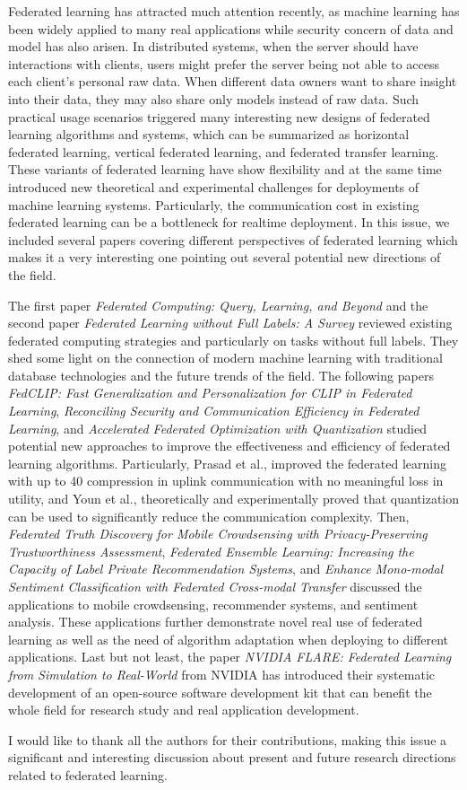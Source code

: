 \documentclass[11pt]{article}
\begin{document}
Federated learning has attracted much attention recently, as machine learning has been widely applied to many real applications while security concern of data and model has also arisen. In distributed systems, when the server should have interactions with clients, users might prefer the server being not able to access each client's personal raw data. When different data owners want to share insight into their data, they may also share only models instead of raw data. Such practical usage scenarios triggered many interesting new designs of federated learning algorithms and systems, which can be summarized as horizontal federated learning, vertical federated learning, and federated transfer learning. These variants of federated learning have show flexibility and at the same time introduced new theoretical and experimental challenges for deployments of machine learning systems. Particularly, the communication cost in existing federated learning can be a bottleneck for realtime deployment. In this issue, we included several papers covering different perspectives of federated learning which makes it a very interesting one pointing out several potential new directions of the field.

The first paper
{\it Federated Computing: Query, Learning, and Beyond} and
the second paper
{\it Federated Learning without Full Labels: A Survey}
reviewed existing federated computing strategies and particularly on tasks without full labels.
They shed some light on the connection of modern machine learning with traditional database technologies and the future trends of the field.
The following papers
{\it FedCLIP: Fast Generalization and Personalization for CLIP in Federated Learning},
{\it Reconciling Security and Communication Efficiency in Federated Learning}, and
{\it Accelerated Federated Optimization with Quantization}
studied potential new approaches to improve the effectiveness and efficiency of federated learning algorithms.
Particularly, Prasad et al., improved the federated learning with up to 40 compression in uplink
communication with no meaningful loss in utility, and Youn et al., theoretically and experimentally proved that quantization can be used to significantly reduce the communication complexity.
Then,
{\it Federated Truth Discovery for Mobile Crowdsensing with Privacy-Preserving Trustworthiness Assessment},
{\it Federated Ensemble Learning: Increasing the Capacity of Label Private Recommendation Systems}, and
{\it Enhance Mono-modal Sentiment Classification with Federated Cross-modal Transfer}
discussed the applications to mobile crowdsensing, recommender systems, and sentiment analysis.
These applications further demonstrate novel real use of federated learning as well as the need of algorithm adaptation when deploying to different applications.
Last but not least, the paper
{\it NVIDIA FLARE: Federated Learning from Simulation to Real-World}
from NVIDIA has introduced their systematic development of an open-source software development kit that can benefit the whole field for research study and real application development.


I would like to thank all the authors for their contributions, making this issue a significant and interesting discussion about present and future research directions related to federated learning.
\end{document}
